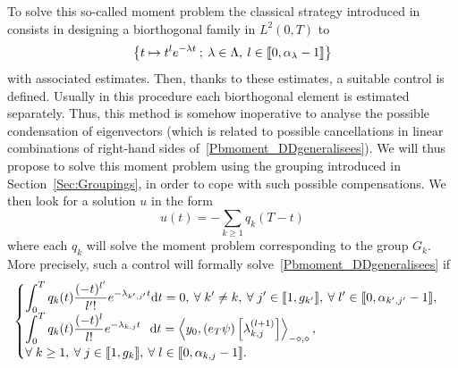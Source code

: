 \documentclass[11pt]{article}
\theoremstyle{definition}
\numberwithin{equation}{section}
\numberwithin{figure}{section}
\numberwithin{table}{section}
\newcommand{\llbracket}{\mathopen{[\mkern -2.7mu[}}
\newcommand{\rrbracket}{\mathclose{]\mkern -2.7mu]}}
\newcommand{\inter}[2]{\llbracket #1,#2 \rrbracket}
\newcommand{\dual}[2]{\left\langle #1, #2 \right\rangle_{-\diamond,\diamond}}
\newcommand{\n}{g}
\newcommand{\md}{\mathrm{d}}
\let\oldforall\forall
\renewcommand*{\forall}{\mathrel{\oldforall}}
\begin{document}
To solve this so-called moment problem the classical strategy introduced in~\cite{FattoriniRussell71} consists in designing a biorthogonal family in $L^2(0,T)$ to
\[
\left\{ t \mapsto t^l e^{-\lambda t} \: ; \: \lambda \in \Lambda, \: l \in \inter{0}{\alpha_\lambda -1} \right\}
\]
with associated estimates. Then, thanks to these estimates, a suitable control is defined. Usually in this procedure each biorthogonal element is estimated separately. Thus, this method is somehow inoperative to analyse the possible condensation of eigenvectors (which is related to possible cancellations in linear combinations of right-hand sides of~\eqref{Pbmoment_DDgeneralisees}). We will thus propose to solve this moment problem using the grouping introduced in Section~\ref{Sec:Groupings}, in order to cope with such possible compensations. We then look for a solution $u$ in the form
\begin{equation}\label{FormeControle}
u(t) = - \sum_{k \geq 1} q_k(T-t)
\end{equation}
where each $q_k$ will solve the moment problem corresponding to the group $G_k$. More precisely, such a control will formally solve~\eqref{Pbmoment_DDgeneralisees} if
\begin{equation}\label{Def:GBF_DD}
\begin{cases}
\displaystyle\int_0^T q_k(t) \frac{(-t)^{l'}}{l'!} e^{-\lambda_{k',j'} t} \md t = 0, \: \forall k' \neq k, \: \forall j'\in \inter{1}{\n_{k'}}, \: \forall l' \in \inter{0}{\alpha_{k',j'}-1},
\\[0.15em]
\displaystyle\int_0^T q_k(t) \frac{(-t)^l}{l!} e^{-\lambda_{k,j} t}\;\;\, \md t = \dual{y_0}{(e_T \psi) \left[\lambda_{k,j}^{(l+1)}\right] },
\\[0.15em]
\displaystyle\forall k \geq 1, \: \forall j \in \inter{1}{\n_k}, \: \forall l \in \inter{0}{\alpha_{k,j}-1}.
\end{cases}
\end{equation}
\end{document}
